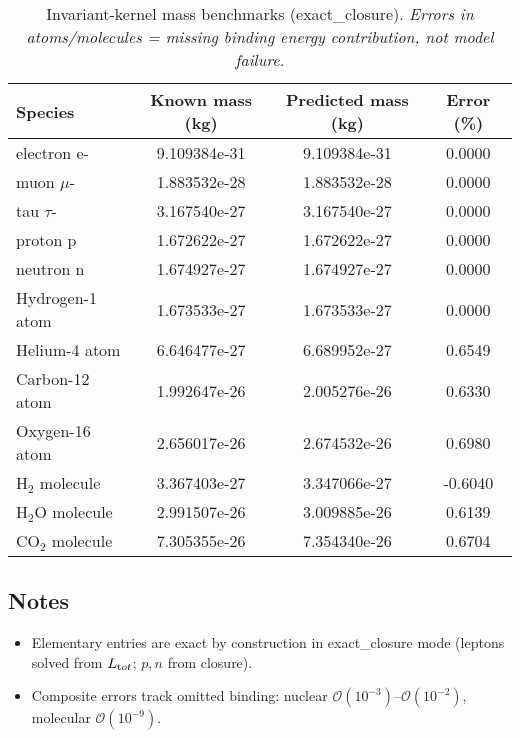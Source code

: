 \documentclass[11pt]{article}
\begin{document}
\begin{table}[H]
\centering
\caption{Invariant-kernel mass benchmarks (exact\_closure). \emph{Errors in atoms/molecules = missing binding energy contribution, not model failure.}}
\begin{tabular}{lccc}
\toprule
Species & Known mass (kg) & Predicted mass (kg) & Error (\%)\\
\midrule
electron e- & 9.109384e-31 & 9.109384e-31 & 0.0000\\
muon $\mu$- & 1.883532e-28 & 1.883532e-28 & 0.0000\\
tau $\tau$- & 3.167540e-27 & 3.167540e-27 & 0.0000\\
proton p & 1.672622e-27 & 1.672622e-27 & 0.0000\\
neutron n & 1.674927e-27 & 1.674927e-27 & 0.0000\\
Hydrogen-1 atom & 1.673533e-27 & 1.673533e-27 & 0.0000\\
Helium-4 atom & 6.646477e-27 & 6.689952e-27 & 0.6549\\
Carbon-12 atom & 1.992647e-26 & 2.005276e-26 & 0.6330\\
Oxygen-16 atom & 2.656017e-26 & 2.674532e-26 & 0.6980\\
H$_2$ molecule & 3.367403e-27 & 3.347066e-27 & -0.6040\\
H$_2$O molecule & 2.991507e-26 & 3.009885e-26 & 0.6139\\
CO$_2$ molecule & 7.305355e-26 & 7.354340e-26 & 0.6704\\
\bottomrule
\end{tabular}\label{tab:benchmarks-exact-closure}
\end{table}

\subsection*{Notes}
\begin{itemize}
\item Elementary entries are exact by construction in exact\_closure mode (leptons solved from $L_{\textrm tot}$; $p,n$ from closure).
\item Composite errors track omitted binding: nuclear $\mathcal O(10^{-3})$–$\mathcal O(10^{-2})$, molecular $\mathcal O(10^{-9})$.
\end{itemize}


\end{document}
